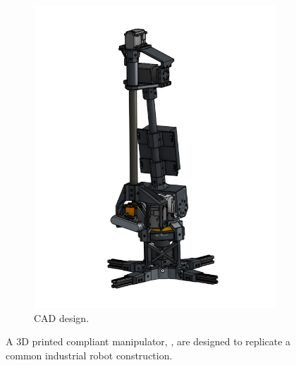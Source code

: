 \begin{figure}[h!]
\begin{subfigure}{0.4\linewidth}
    \includegraphics[width=\linewidth]{r_mini_cad.png}
    \caption{\rimini CAD design.}
  \end{subfigure}
  \caption{A 3D printed compliant manipulator, \rimini, are designed to replicate a common industrial
  robot construction.}
  \label{fig:r_mini_hardware}
\end{figure}

